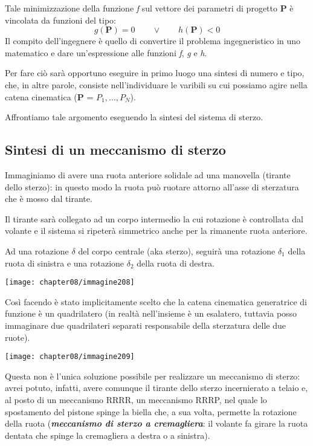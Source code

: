 Tale minimizzazione della funzione \emph{f} sul vettore dei parametri di progetto \textbf{P} è vincolata da funzioni del tipo:
\[g(\mathbf{P}) = 0 \qquad\lor\qquad h(\mathbf{P}) < 0\]
Il compito dell'ingegnere è quello di convertire il problema ingegneristico in uno matematico e dare un'espressione alle funzioni \emph{f}, \emph{g} e \emph{h}.

Per fare ciò sarà opportuno  eseguire in primo luogo una sintesi di numero e tipo, che, in altre parole, consiste nell'individuare le varibili su cui possiamo agire nella catena cinematica (\textbf{P} = $P_1, \dots, P_N$).

Affrontiamo tale argomento eseguendo la sintesi del sistema di sterzo.
\subsection{Sintesi di un meccanismo di sterzo}

\begin{minipage}{.5\textwidth}
Immaginiamo di avere una ruota anteriore solidale ad una manovella (tirante dello sterzo): in questo modo la ruota può ruotare attorno all'asse di sterzatura che è mosso dal tirante.

Il tirante sarà collegato ad un corpo intermedio la cui rotazione è controllata dal volante e il sistema si ripeterà simmetrico anche per la rimanente ruota anteriore. 

Ad una rotazione $\delta$ del corpo centrale (aka sterzo), seguirà una rotazione $\delta_1$ della ruota di sinistra e una rotazione $\delta_2$ della ruota di destra.
\end{minipage}
\hfill
\begin{minipage}{.5\textwidth}
\centering
\texttt{[image: chapter08/immagine208]}
\end{minipage}

Così facendo è stato implicitamente scelto che la catena cinematica generatrice di funzione è un quadrilatero (in realtà nell'insieme è un esalatero, tuttavia posso immaginare due quadrilateri separati responsabile della sterzatura delle due ruote).

\begin{minipage}{.5\textwidth}
\centering
\texttt{[image: chapter08/immagine209]}
\end{minipage}
\hfill
\begin{minipage}{.5\textwidth}
Questa non è l'unica soluzione possibile per realizzare un meccanismo di sterzo: avrei potuto, infatti, avere comunque il tirante dello sterzo incernierato a telaio e, al posto di un meccanismo RRRR, un meccanismo RRRP, nel quale lo spostamento del pistone spinge la biella che, a sua volta, permette la rotazione della ruota ({\bfseries \emph{meccanismo di sterzo a cremagliera}}: il volante fa girare la ruota dentata che spinge la cremagliera a destra o a sinistra).
\end{minipage}

